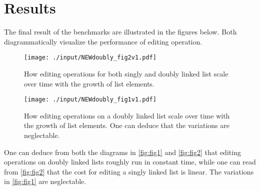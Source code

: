 \documentclass[a4paper, 11pt]{article}
\begin{document}
    \clearpage
    \section*{Results}
    The final result of the benchmarks are illustrated in the figures below.
    Both diagrammatically visualize the performance of editing operation. 
    
    \begin{figure}[h]
        \centering
        \texttt{[image: ./input/NEWdoubly\_fig2v1.pdf]}
        \caption{How editing operations for both singly and doubly linked list scale over time
        with the growth of list elements.}
        \label{fig:fig2}
    \end{figure}

    \begin{figure}[h]
        \centering
        \texttt{[image: ./input/NEWdoubly\_fig1v1.pdf]}
        \caption{How editing operations on a doubly linked list scale over 
        time with the growth of list elements. One can deduce that the variations are 
        neglectable.}
        \label{fig:fig1}
    \end{figure}

    One can deduce from both the diagrams in \autoref{fig:fig1} and \autoref{fig:fig2} 
    that editing operations on doubly linked lists roughly run in constant time,
    while one can read from \autoref{fig:fig2} that the cost for 
    editing a singly linked list is linear. 
    The variations in \autoref{fig:fig1} are neglectable.
\end{document}
